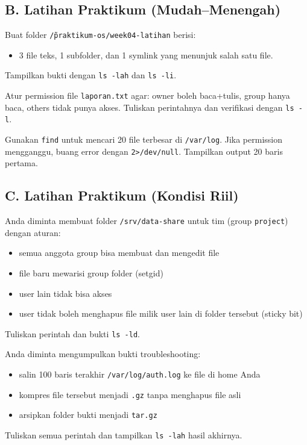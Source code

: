 \subsection*{B. Latihan Praktikum (Mudah--Menengah)}
\begin{exercisebox}[4.C]
Buat folder \texttt{\~/praktikum-os/week04-latihan} berisi:
\begin{itemize}
    \item 3 file teks, 1 subfolder, dan 1 symlink yang menunjuk salah satu file.
\end{itemize}
Tampilkan bukti dengan \texttt{ls -lah} dan \texttt{ls -li}.
\end{exercisebox}

\begin{exercisebox}[4.D]
Atur permission file \texttt{laporan.txt} agar:
owner boleh baca+tulis, group hanya baca, others tidak punya akses.
Tuliskan perintahnya dan verifikasi dengan \texttt{ls -l}.
\end{exercisebox}

\begin{exercisebox}[4.E]
Gunakan \texttt{find} untuk mencari 20 file terbesar di \texttt{/var/log}.
Jika permission mengganggu, buang error dengan \texttt{2>/dev/null}.
Tampilkan output 20 baris pertama.
\end{exercisebox}

\subsection*{C. Latihan Praktikum (Kondisi Riil)}
\begin{exercisebox}
Anda diminta membuat folder \texttt{/srv/data-share} untuk tim (group \texttt{project}) dengan aturan:
\begin{itemize}
\item semua anggota group bisa membuat dan mengedit file
\item file baru mewarisi group folder (setgid)
\item user lain tidak bisa akses
\item user tidak boleh menghapus file milik user lain di folder tersebut (sticky bit)
\end{itemize}
Tuliskan perintah dan bukti \texttt{ls -ld}.
\end{exercisebox}

\begin{exercisebox}
Anda diminta mengumpulkan bukti troubleshooting:
\begin{itemize}
\item salin 100 baris terakhir \texttt{/var/log/auth.log} ke file di home Anda
\item kompres file tersebut menjadi \texttt{.gz} tanpa menghapus file asli
\item arsipkan folder bukti menjadi \texttt{tar.gz}
\end{itemize}
Tuliskan semua perintah dan tampilkan \texttt{ls -lah} hasil akhirnya.
\end{exercisebox}

